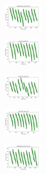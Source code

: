 \begin{figure}[H]
\begin{subfigure}
    \end{subfigure}
    \hfill
    \begin{subfigure}
        \centering
        \includegraphics[width=0.234\textwidth]{img/bmb/newthyroid_set_const_10_277451237_cost.png}
    \end{subfigure}
    \hfill
    \begin{subfigure}
        \centering
        \includegraphics[width=0.234\textwidth]{img/bmb/iris_set_const_10_49258669_cost.png}
    \end{subfigure}
    \hfill
    \begin{subfigure}
        \centering
        \includegraphics[width=0.234\textwidth]{img/bmb/ecoli_set_const_10_49258669_cost.png}
    \end{subfigure}
    \hfill
    \begin{subfigure}
        \centering
        \includegraphics[width=0.234\textwidth]{img/bmb/rand_set_const_10_49258669_cost.png}
    \end{subfigure}
    \hfill
    \begin{subfigure}
        \centering
        \includegraphics[width=0.234\textwidth]{img/bmb/newthyroid_set_const_10_49258669_cost.png}
    \end{subfigure}
    \hfill
    \begin{subfigure}

\end{subfigure}
\end{figure}
